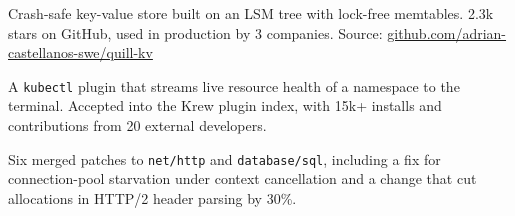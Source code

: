 
Crash-safe key-value store built on an LSM tree with lock-free memtables. 2.3k stars on GitHub, used in production by 3 companies. Source: \href{https://github.com/adrian-castellanos-swe/quill-kv}{github.com/adrian-castellanos-swe/quill-kv}

\smallskip
{}

\cvdivider

A \texttt{kubectl} plugin that streams live resource health of a namespace to the terminal. Accepted into the Krew plugin index, with 15k+ installs and contributions from 20 external developers.

\smallskip
{}

\cvdivider

Six merged patches to \texttt{net/http} and \texttt{database/sql}, including a fix for connection-pool starvation under context cancellation and a change that cut allocations in HTTP/2 header parsing by 30\%.

\smallskip
{}


\newpage


\cvcolumnbreak




